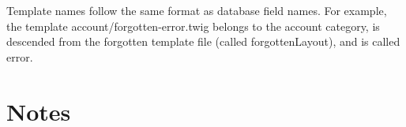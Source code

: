 \begin{DoxyItemize}
\item Template names follow the same format as database field names. For example, the template account/forgotten-\/error.\-twig belongs to the account category, is descended from the forgotten template file (called forgotten\-Layout), and is called error.
\end{DoxyItemize}

\section*{Notes}